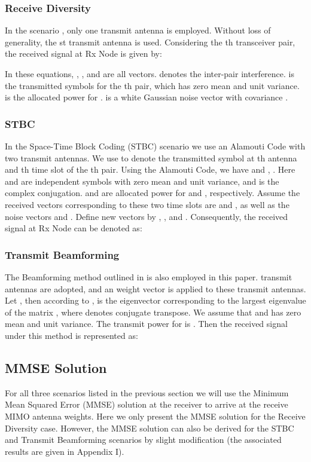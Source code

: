 \documentclass[draftcls,onecolumn,peerview,12pt]{IEEEtran}
\begin{document}
\subsubsection{ Receive Diversity}

In the  scenario \cite{14_Wireless_Comm}, only one
transmit antenna is employed. Without loss of generality, the st
transmit antenna is used. Considering the th transceiver pair,
the received signal at Rx Node  is given by:



In these equations, , ,  and
 are all  vectors.  denotes the
inter-pair interference.  is the transmitted symbols for the
th pair, which has zero mean and unit variance.  is the
allocated power for .  is a white Gaussian
noise vector with covariance .

\subsubsection{ STBC}

In the  Space-Time Block Coding (STBC) scenario we use
an Alamouti Code \cite{17_alamouti} with two transmit antennas. We
use  to denote the transmitted symbol at th antenna
and th time slot of the th pair. Using the Alamouti Code, we
have  and ,
. Here  and  are
independent symbols with zero mean and unit variance, and  is the complex conjugation.  and  are
allocated power for  and , respectively.
Assume the received vectors corresponding to these two time slots
are  and , as well as the
noise vectors  and . Define
new vectors by , ,  and
. Consequently, the received signal at Rx Node
 can be denoted as:



\subsubsection{ Transmit Beamforming}

The Beamforming method outlined in \cite{15_Chen2006, 18_coded_MIMO}
is also employed in this paper.  transmit antennas are adopted,
and an  weight vector  is applied to
these transmit antennas. Let , then according to \cite{15_Chen2006,
18_coded_MIMO},  is the eigenvector corresponding to
the largest eigenvalue of the matrix , where  denotes conjugate transpose. We
assume that  and  has zero
mean and unit variance. The transmit power for  is . Then
the received signal under this method is represented as:



\subsection{MMSE Solution}
For all three scenarios listed in the previous section we will use
the Minimum Mean Squared Error (MMSE) solution at the receiver
\cite{13_JointOptimal1998, 20_MMSE, 21_Spatial_Multiplexing} to
arrive at the receive MIMO antenna weights. Here we only present the
MMSE solution for the  Receive Diversity case. However,
the MMSE solution can also be derived for the  STBC and
 Transmit Beamforming scenarios by slight modification
(the associated results are given in Appendix I).
\end{document}
